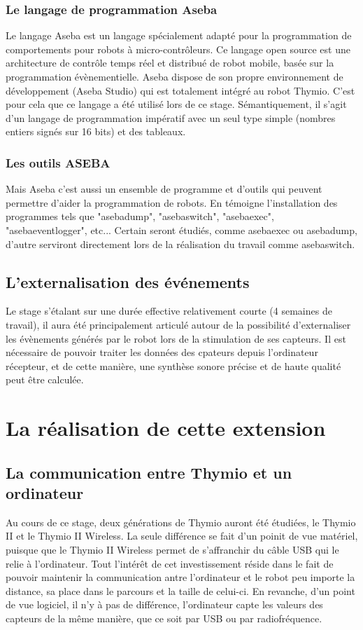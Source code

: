 \documentclass[a4paper, 12pt]{report}
\begin{document}
\subsection{Le langage de programmation Aseba}
Le langage Aseba est un langage spécialement adapté pour la programmation de comportements pour robots à micro-contrôleurs. Ce langage open source est une architecture de contrôle temps réel et distribué de robot mobile, basée sur la programmation évènementielle. Aseba dispose de son propre environnement de développement (Aseba Studio) qui est totalement intégré au robot Thymio. C'est pour cela que ce langage a été utilisé lors de ce stage. Sémantiquement, il s'agit d'un langage de programmation impératif avec un seul type simple (nombres entiers signés sur 16 bits) et des tableaux.

\subsection{Les outils ASEBA}
Mais Aseba c'est aussi un ensemble de programme et d'outils qui peuvent permettre d'aider la programmation de robots. En témoigne l'installation des programmes tels que "asebadump", "asebaswitch", "asebaexec", "asebaeventlogger", etc...
Certain seront étudiés, comme asebaexec ou asebadump, d'autre serviront directement lors de la réalisation du travail comme asebaswitch.

\section{L'externalisation des événements}
Le stage s'étalant sur une durée effective relativement courte (4 semaines de travail), il aura été principalement articulé autour de la possibilité d'externaliser les évènements générés par le robot lors de la stimulation de ses capteurs. Il est nécessaire de pouvoir traiter les données des cpateurs depuis l'ordinateur récepteur, et de cette manière, une synthèse sonore précise et de haute qualité peut être calculée.

\chapter{La réalisation de cette extension}
\section{La communication entre Thymio et un ordinateur}
Au cours de ce stage, deux générations de Thymio auront été étudiées, le Thymio II et le Thymio II Wireless. La seule différence se fait d'un poinit de vue matériel, puisque que le Thymio II Wireless permet de s'affranchir du câble USB qui le relie à l'ordinateur. Tout l'intérêt de cet investissement réside dans le fait de pouvoir maintenir la communication antre l'ordinateur et le robot peu importe la distance, sa place dans le parcours et la taille de celui-ci. En revanche, d'un point de vue logiciel, il n'y à pas de différence, l'ordinateur capte les valeurs des capteurs de la même manière, que ce soit par USB ou par radiofréquence.
\end{document}
